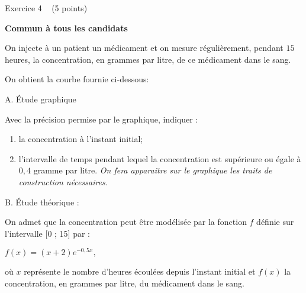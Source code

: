 
%
\begin{h2}Exercice 4   (5 points)\end{h2}
\textbf{Commun à tous les candidats}
\par
On injecte à un patient un médicament et on mesure régulièrement, pendant $15$ heures, la concentration, en grammes par litre, de ce médicament dans le sang.
\par
On obtient la courbe fournie ci-dessous:

\begin{center}
\end{center}
\begin{h3}A. Étude graphique\end{h3}
Avec la précision permise par le graphique, indiquer :
\begin{enumerate}
     \item
     la concentration à l'instant initial;
     \item
     l'intervalle de temps pendant lequel la concentration est supérieure ou égale à $0,4$ gramme par litre.
     \textit{On fera apparaitre sur le graphique les traits de construction nécessaires.}
\end{enumerate}
\begin{h3}B. Étude théorique :\end{h3}
On admet que la concentration peut être modélisée par la fonction $f$ définie sur l'intervalle [0 ; 15] par :
\begin{center}$f\left(x\right)=\left(x+2\right)e^{- 0,5x},$\end{center}
où $x$ représente le nombre d'heures écoulées depuis l'instant initial et $f\left(x\right)$ la concentration, en grammes par litre, du médicament dans le sang.
